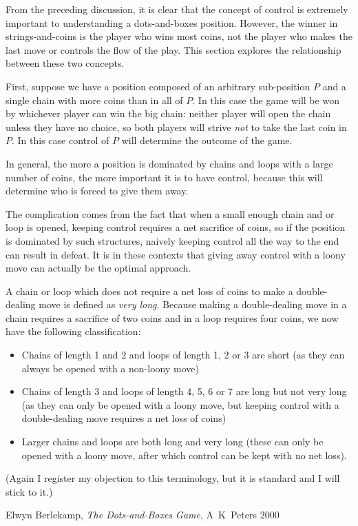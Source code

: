 \documentclass[a4paper,twocolumn]{article}
\begin{document}
From the preceding discussion, it is clear that the concept of control
is extremely important to understanding a dots-and-boxes
position. However, the winner in strings-and-coins is the player who
wins most coins, not the player who makes the last move or controls
the flow of the play. This section explores the relationship between
these two concepts.

First, suppose we have a position composed of an arbitrary
sub-position $P$ and a single chain with more coins than in all of
$P$. In this case the game will be won by whichever player can win the
big chain: neither player will open the chain unless they have no
choice, so both players will strive \emph{not} to take the last coin
in $P$. In this case control of $P$ will determine the outcome of the
game.

In general, the more a position is dominated by chains and loops with
a large number of coins, the more important it is to have control,
because this will determine who is forced to give them away.

The complication comes from the fact that when a small enough chain
and or loop is opened, keeping control requires a net sacrifice of
coins, so if the position is dominated by such structures, naively
keeping control all the way to the end can result in defeat. It is in
these contexts that giving away control with a loony move can actually
be the optimal approach.

A chain or loop which does not require a net loss of coins to make a
double-dealing move is defined as \emph{very long}. Because making a
double-dealing move in a chain requires a sacrifice of two coins and
in a loop requires four coins, we now have the following
classification:

\begin{itemize}
  \item Chains of length 1 and 2 and loops of length 1, 2 or 3 are
    short (as they can always be opened with a non-loony move)
  \item Chains of length 3 and loops of length 4, 5, 6 or 7 are long
    but not very long (as they can only be opened with a loony move,
    but keeping control with a double-dealing move requires a net loss
    of coins)
  \item Larger chains and loops are both long and very long (these can
    only be opened with a loony move, after which control can be kept
    with no net loss).
\end{itemize}

(Again I register my objection to this terminology, but it is standard
and I will stick to it.)

\begin{thebibliography}{99}
   Elwyn Berlekamp, \emph{The Dots-and-Boxes Game},
    A~K~Peters 2000
\end{thebibliography}
\end{document}
